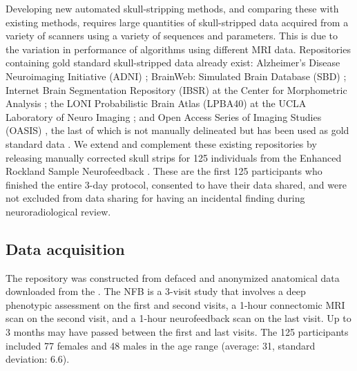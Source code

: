 \DIFaddend \par Developing new automated skull-stripping methods, and comparing these with existing methods, requires large quantities of \DIFdelbegin {}\DIFdelend \DIFaddbegin {}\DIFaddend skull-stripped data acquired from a variety of scanners using a variety of sequences and parameters. This is due to the variation in performance of algorithms using different MRI data. Repositories containing gold standard skull-stripped data already exist: \DIFdelbegin {}\DIFdelend \DIFaddbegin {}\DIFaddend Alzheimer's Disease Neuroimaging Initiative (ADNI) \cite{pmid17476317}; BrainWeb: Simulated Brain Database (SBD) \cite{brainweb}; \DIFdelbegin {}\DIFdelend \DIFaddbegin {}\DIFaddend Internet Brain Segmentation Repository (IBSR) at the Center for Morphometric Analysis \cite{IBSR}; the LONI Probabilistic Brain Atlas (LPBA40) at the UCLA Laboratory of Neuro Imaging \cite{lpba40}; and \DIFdelbegin {}\DIFdelend \DIFaddbegin {}\DIFaddend Open Access Series of Imaging Studies (OASIS) \cite{oasis}, the last of which is not manually delineated but has been used as gold standard data \cite{Iglesias2011, MASS}. We extend and complement these existing repositories by releasing manually corrected skull strips for 125 individuals from the \DIFdelbegin {}\DIFdelend \DIFaddbegin {}\DIFaddend Enhanced Rockland Sample Neurofeedback \DIFdelbegin {}\DIFdelend \DIFaddbegin {}\DIFaddend . These are the first 125 participants who finished the entire 3-day protocol, consented to have their data shared, and were not excluded from data sharing for having an incidental finding during neuroradiological review.  

\subsection*{Data acquisition}

\par The repository was constructed from defaced and anonymized anatomical data downloaded from the \DIFdelbegin {}\DIFdelend \DIFaddbegin {}\DIFaddend \cite{Nooner2012}. The NFB is a 3-visit study that involves a deep phenotypic assessment on the first and second visits, a 1-hour connectomic MRI scan on the second visit, and a 1-hour neurofeedback scan on the last visit. Up to 3 months may have passed between the first and last visits. The 125 participants included 77 females and 48 males in the \DIFdelbegin {}\DIFdelend \DIFaddbegin {}\DIFaddend age range (average: 31, standard deviation: 6.6). 

